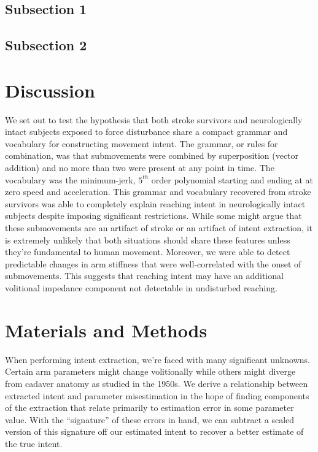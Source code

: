 \documentclass[10pt]{article}
\begin{document}
\subsection*{Subsection 1}

\subsection*{Subsection 2}

\section*{Discussion}
We set out to test the hypothesis that both stroke survivors and neurologically intact subjects exposed to force disturbance share a compact grammar and vocabulary for constructing movement intent. The grammar, or rules for combination, was that submovements were combined by superposition (vector addition) and no more than two were present at any point in time. The vocabulary was the minimum-jerk, $5^{th}$ order polynomial starting and ending at at zero speed and acceleration. This grammar and vocabulary recovered from stroke survivors was able to completely explain reaching intent in neurologically intact subjects despite imposing significant restrictions. While some might argue that these submovements are an artifact of stroke or an artifact of intent extraction, it is extremely unlikely that both situations should share these features unless they're fundamental to human movement. Moreover, we were able to detect predictable changes in arm stiffness that were well-correlated with the onset of submovements. This suggests that reaching intent may have an additional volitional impedance component not detectable in undisturbed reaching.

\section*{Materials and Methods}
When performing intent extraction, we're faced with many significant unknowns. Certain arm parameters might change volitionally while others might diverge from cadaver anatomy as studied in the 1950s. We derive a relationship between extracted intent and parameter misestimation in the hope of finding components of the extraction that relate primarily to estimation error in some parameter value. With the ``signature'' of these errors in hand, we can subtract a scaled version of this signature off our estimated intent to recover a better estimate of the true intent.
\end{document}

